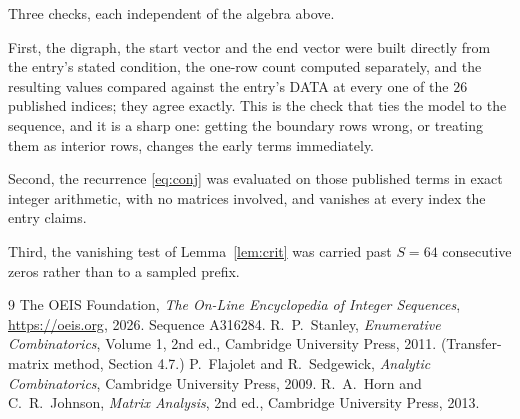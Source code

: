 \documentclass[11pt,a4paper]{article}
\theoremstyle{plain}
\theoremstyle{definition}
\begin{document}
Three checks, each independent of the algebra above.

First, the digraph, the start vector and the end vector were built directly from the
entry's stated condition, the one-row count computed separately, and the resulting values
compared against the entry's DATA at every one of the $26$ published indices; they
agree exactly. This is the check that ties the model to the sequence, and it is a sharp one:
getting the boundary rows wrong, or treating them as interior rows, changes the early terms
immediately.

Second, the recurrence \eqref{eq:conj} was evaluated on those published terms in exact
integer arithmetic, with no matrices involved, and vanishes at every index the entry claims.

Third, the vanishing test of Lemma~\ref{lem:crit} was carried past $S=64$ consecutive
zeros rather than to a sampled prefix.

\begin{thebibliography}{9}
 The OEIS Foundation, \emph{The On-Line Encyclopedia of Integer
Sequences}, \url{https://oeis.org}, 2026. Sequence A316284.
 R.~P.~Stanley, \emph{Enumerative Combinatorics}, Volume 1, 2nd ed.,
Cambridge University Press, 2011. (Transfer-matrix method, Section 4.7.)
 P.~Flajolet and R.~Sedgewick, \emph{Analytic Combinatorics}, Cambridge
University Press, 2009.
 R.~A.~Horn and C.~R.~Johnson, \emph{Matrix Analysis}, 2nd ed., Cambridge
University Press, 2013.
\end{thebibliography}
\end{document}
